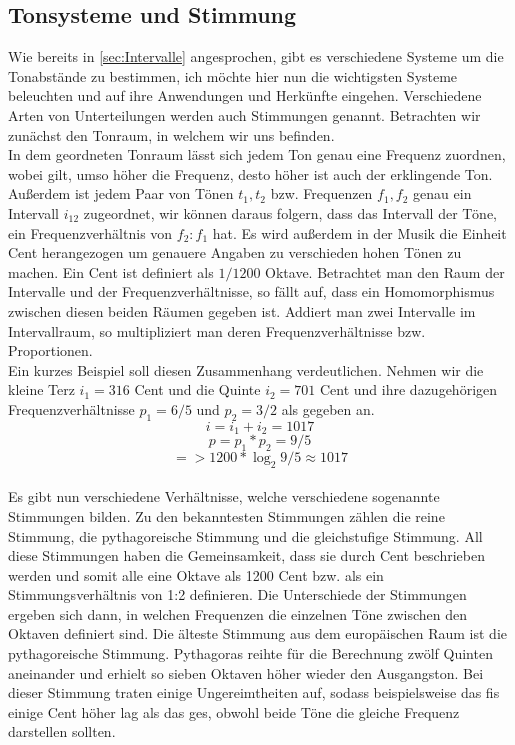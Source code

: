 \subsection*{Tonsysteme und Stimmung}
\label{sec:Tonsysteme}
Wie bereits in \ref{sec:Intervalle} angesprochen, gibt es verschiedene Systeme um die Tonabstände zu bestimmen, ich möchte hier nun die wichtigsten Systeme beleuchten und auf ihre Anwendungen und Herkünfte eingehen.
Verschiedene Arten von Unterteilungen werden auch Stimmungen genannt. Betrachten wir zunächst den Tonraum, in welchem wir uns befinden. \\
In dem geordneten Tonraum lässt sich jedem Ton genau eine Frequenz zuordnen, wobei gilt, umso höher die Frequenz, desto höher ist auch der erklingende Ton. Außerdem ist jedem Paar von Tönen $t_1, t_2$ bzw. Frequenzen $f_1, f_2$ genau ein Intervall $i_{12}$ zugeordnet, 
wir können daraus folgern, dass das Intervall der Töne, ein Frequenzverhältnis von $f_2 : f_1$ hat. Es wird außerdem in der Musik die Einheit Cent herangezogen um genauere Angaben zu verschieden hohen Tönen zu machen. Ein Cent ist definiert als 
$1/1200$ Oktave. Betrachtet man den Raum der Intervalle und der Frequenzverhältnisse, so fällt auf, dass ein Homomorphismus zwischen diesen beiden Räumen gegeben ist. Addiert man zwei Intervalle im Intervallraum, so multipliziert man deren Frequenzverhältnisse bzw. Proportionen. \\
Ein kurzes Beispiel soll diesen Zusammenhang verdeutlichen. Nehmen wir die kleine Terz $i_1 =  316$ Cent und die Quinte $i_2 =  701$ Cent und ihre dazugehörigen Frequenzverhältnisse $p_1 = 6/5$ und $p_2 = 3/2$ als gegeben an.
$$    i = i_1 + i_2 = 1017  $$
$$    p = p_1 * p_2 = 9/5   $$
$$   => 1200 * \log_2{9/5} \approx 1017     $$
\\
Es gibt nun verschiedene Verhältnisse, welche verschiedene sogenannte Stimmungen bilden. Zu den bekanntesten Stimmungen zählen die reine Stimmung, die pythagoreische Stimmung und die gleichstufige Stimmung.
All diese Stimmungen haben die Gemeinsamkeit, dass sie durch Cent beschrieben werden und somit alle eine Oktave als 1200 Cent bzw. als ein Stimmungsverhältnis von 1:2 definieren. Die Unterschiede der Stimmungen ergeben sich dann, in welchen Frequenzen die einzelnen Töne zwischen den Oktaven definiert sind. Die älteste Stimmung aus dem europäischen Raum ist die pythagoreische Stimmung. Pythagoras reihte für die Berechnung zwölf Quinten aneinander und erhielt so sieben Oktaven höher wieder den Ausgangston. Bei dieser Stimmung traten einige 
Ungereimtheiten auf, sodass beispielsweise das fis einige Cent höher lag als das ges, obwohl beide Töne die gleiche Frequenz darstellen sollten. 
